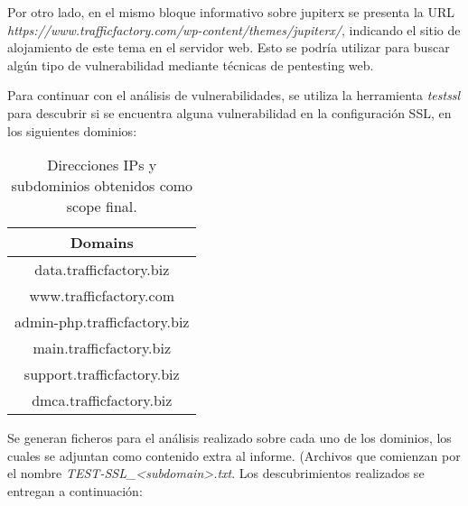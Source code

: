 \documentclass[12pt,oneside,a4paper]{book}
\begin{document}
\hspace{20pt}
Por otro lado, en el mismo bloque informativo sobre jupiterx se presenta la URL \newline
\textit{https://www.trafficfactory.com/wp-content/themes/jupiterx/}, indicando el sitio de alojamiento de este tema en el servidor web. Esto se podría utilizar para buscar algún tipo de vulnerabilidad mediante técnicas de pentesting web.

\vspace{1em}

\hspace{20pt}
Para continuar con el análisis de vulnerabilidades, se utiliza la herramienta \textit{testssl} para descubrir si se encuentra alguna vulnerabilidad en la configuración SSL, en los siguientes dominios:

\vspace{1em}

\begin{table}[H]
    \centering
    \begin{tabular}{|c|}
        \hline
        \textbf{Domains} \\
        \hline
        data.trafficfactory.biz  \\
        \hline
        www.trafficfactory.com  \\
        \hline
        admin-php.trafficfactory.biz  \\
        \hline
        main.trafficfactory.biz  \\
        \hline
        support.trafficfactory.biz  \\
        \hline
        dmca.trafficfactory.biz  \\
        \hline
    \end{tabular}
    \caption{Direcciones IPs y subdominios obtenidos como scope final.}
    \label{tab:mylabel}
\end{table}

\vspace{1em}

\hspace{20pt}
Se generan ficheros para el análisis realizado sobre cada uno de los dominios, los cuales se adjuntan como contenido extra al informe. (Archivos que comienzan por el nombre \textit{TEST-SSL\_<subdomain>.txt}. Los descubrimientos realizados se entregan a continuación:

\vspace{1em}
\end{document}
